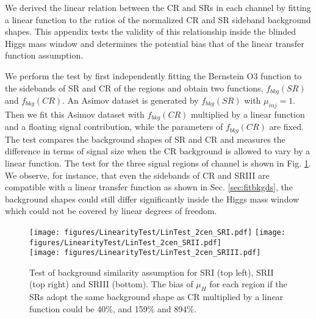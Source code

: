 
We derived the linear relation between the CR and SRs in each channel 
by fitting a linear function to the ratios of the normalized 
CR and SR sideband background shapes.  This appendix tests the validity of this relationship 
inside the blinded Higgs mass window and determines the potential bias that of the linear transfer function assumption. 

We perform the test by first independently fitting the Bernstein O3 function
 to the sidebands of SR and CR of the \twocentral regions and obtain 
two functions, $f_{bkg}(SR)$ and $f_{bkg}(CR)$. An Asimov dataset 
is generated by $f_{bkg}(SR)$ with $\mu_{inj}=1$. Then we fit this 
Asimov dataset with $f_{bkg}(CR)$ multiplied by a linear function and a floating 
signal contribution, while the parameters of $f_{bkg}(CR)$ are fixed. The test 
 compares the background shapes of SR and CR and measures the difference 
in terms of signal size when the CR background is allowed to vary by a linear 
function. The test for the three signal regions of \twocentral channel is shown in 
Fig. \ref{fig:LinearTest}. We observe, for instance, that even the sidebands of CR and SRIII 
are compatible with a linear transfer function as shown in Sec. \ref{sec:fitbkgds}, 
the background shapes could still differ significantly inside the Higgs mass window which 
could not be covered by linear degrees of freedom. 


\begin{figure}[htbp]
  \centering
 \texttt{[image: figures/LinearityTest/LinTest\_2cen\_SRI.pdf]}
 \texttt{[image: figures/LinearityTest/LinTest\_2cen\_SRII.pdf]}\\
 \texttt{[image: figures/LinearityTest/LinTest\_2cen\_SRIII.pdf]}\\

\caption{Test of background similarity assumption for \twocentral SRI (top left), SRII (top right) and SRIII (bottom).
The bias of $\mu_{H}$ for each region if the SRs adopt the same background shape as CR multiplied by a linear function 
could be 40\%, and 159\% and 894\%. }
  \label{fig:LinearTest}
\end{figure}
